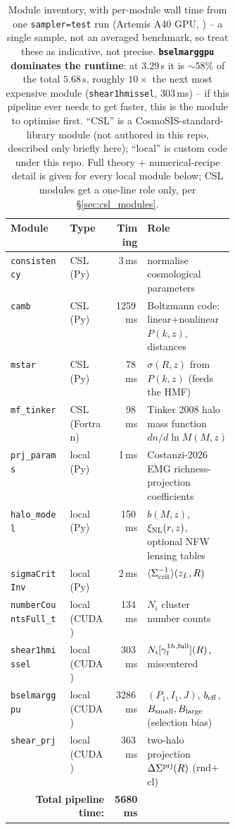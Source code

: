 \documentclass[a4paper, 11pt]{article}
\newcommand{\xinl}{\xi_{\rm NL}}
\newcommand{\DSprj}{\Delta\Sigma^{\rm prj}}
\newcommand{\Bsmall}{B_{\rm small}}
\newcommand{\Blarge}{B_{\rm large}}
\newcommand{\modname}[1]{\textcolor{kwcol}{\texttt{#1}}}
\newcommand{\pyfile}[1]{{\small\path{#1}}}
\begin{document}
\begin{table}[H]
\centering
\small
\begin{tabular}{@{}l l r p{0.37\linewidth}@{}}
\toprule
Module & Type & Timing & Role \\
\midrule
\modname{consistency}       & CSL (Py)      & 3\,ms    & normalise cosmological parameters \\
\modname{camb}               & CSL (Py)      & 1259\,ms & Boltzmann code: linear+nonlinear $P(k,z)$, distances \\
\modname{mstar}              & CSL (Py)      & 78\,ms   & $\sigma(R,z)$ from $P(k,z)$ (feeds the HMF) \\
\modname{mf\_tinker}         & CSL (Fortran) & 98\,ms   & Tinker 2008 halo mass function $dn/d\ln M(M,z)$ \\
\modname{prj\_params}        & local (Py)    & 1\,ms    & Costanzi-2026 EMG richness-projection coefficients \\
\modname{halo\_model}        & local (Py)    & 150\,ms  & $b(M,z)$, $\xinl(r,z)$, optional NFW lensing tables \\
\modname{sigmaCritInv}       & local (Py)    & 2\,ms    & $\langle\Sigma_{\rm crit}^{-1}\rangle(z_L, R)$ \\
\modname{numberCountsFull\_t}& local (CUDA)  & 134\,ms  & $N_i$ cluster number counts \\
\modname{shear1hmissel}      & local (CUDA)  & 303\,ms  & $N_i[\gamma_t^{1h,{\rm full}}](R)$, miscentered \\
\modname{bselmarggpu}        & local (CUDA)  & 3286\,ms & $(P_1,I_1,J)$, $b_{\rm eff}$, $\Bsmall,\Blarge$ (selection bias) \\
\modname{shear\_prj}         & local (CUDA)  & 363\,ms  & two-halo projection $\DSprj(R)$ (rnd$+$cl) \\
\midrule
\multicolumn{2}{r}{\textbf{Total pipeline time:}} & \textbf{5680\,ms} & \\
\bottomrule
\end{tabular}
\caption{Module inventory, with per-module wall time from one
\texttt{sampler=test} run (Artemis A40 GPU,
\pyfile{shearTot_pipeline.ini}) -- a single sample, not an
averaged benchmark, so treat these as indicative, not precise.
\textbf{\modname{bselmarggpu} dominates the runtime}: at $3.29\,$s it is
$\sim 58\%$ of the total $5.68\,$s, roughly $10\times$ the next most
expensive module (\modname{shear1hmissel}, $303\,$ms) -- if this pipeline
ever needs to get faster, this is the module to optimise first. ``CSL'' is
a CosmoSIS-standard-library module (not authored in this repo, described
only briefly here); ``local'' is custom code under this repo. Full theory
+ numerical-recipe detail is given for every local module below; CSL
modules get a one-line role only, per \S\ref{sec:csl_modules}.}
\label{tab:gpu-module-roles}
\end{table}
\end{document}
